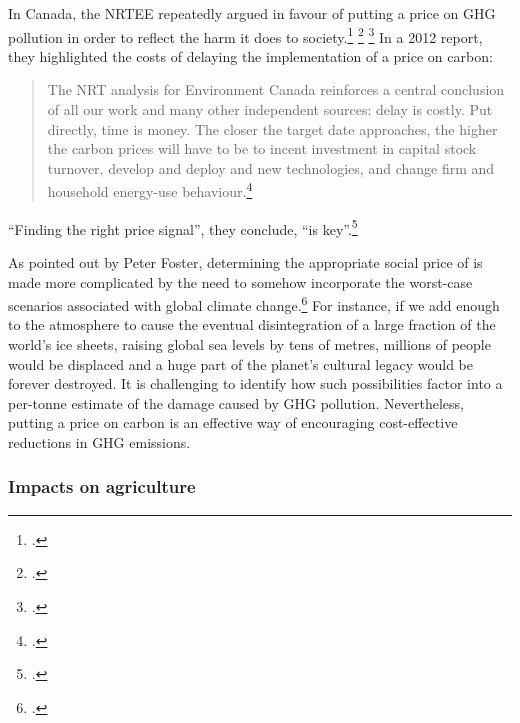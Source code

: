 \documentclass[10pt]{article}
\begin{document}
In Canada, the NRTEE repeatedly argued in favour of putting a price on GHG pollution in order to reflect the harm it does to society.\footcite[See: ][]{Achieving2050} \footcite[][]{Achieving2050Outreach} \footcite[][p. 18]{FramingFuture}
In a 2012 report, they highlighted the costs of delaying the implementation of a price on carbon:
\begin{quote}
The NRT analysis for Environment Canada reinforces a central conclusion of all our work and many other independent sources: delay is costly. Put directly, time is money. The closer the target date approaches, the higher the carbon prices will have to be to incent investment in capital stock turnover, develop and deploy and new technologies, and change firm and household energy-use behaviour.\footcite[][p. 114]{RealityCheck2012}
\end{quote}
``Finding the right price signal'', they conclude, ``is key''.\footcite[][p. 117]{RealityCheck2012}



As pointed out by Peter Foster, determining the appropriate social price of  is made more complicated by the need to somehow incorporate the worst-case scenarios associated with global climate change.\footcite[][]{ApocExternal}
For instance, if we add enough  to the atmosphere to cause the eventual disintegration of a large fraction of the world's ice sheets, raising global sea levels by tens of metres, millions of people would be displaced and a huge part of the planet's cultural legacy would be forever destroyed.
It is challenging to identify how such possibilities factor into a per-tonne estimate of the damage caused by GHG pollution.
Nevertheless, putting a price on carbon is an effective way of encouraging cost-effective reductions in GHG emissions.



	\subsubsection{Impacts on agriculture}
\end{document}
